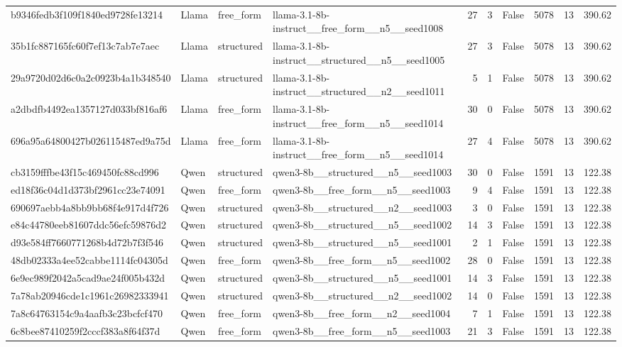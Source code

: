 \begin{longtable}{llllrrrrrr}
b9346fedb3f109f1840ed9728fe13214 & Llama & free\_form & llama-3.1-8b-instruct\_\_free\_form\_\_n5\_\_seed1008 & 27 & 3 & False & 5078 & 13 & 390.62 \\
35b1fc887165fc60f7ef13c7ab7e7aec & Llama & structured & llama-3.1-8b-instruct\_\_structured\_\_n5\_\_seed1005 & 27 & 3 & False & 5078 & 13 & 390.62 \\
29a9720d02d6c0a2c0923b4a1b348540 & Llama & structured & llama-3.1-8b-instruct\_\_structured\_\_n2\_\_seed1011 & 5 & 1 & False & 5078 & 13 & 390.62 \\
a2dbdfb4492ea1357127d033bf816af6 & Llama & free\_form & llama-3.1-8b-instruct\_\_free\_form\_\_n5\_\_seed1014 & 30 & 0 & False & 5078 & 13 & 390.62 \\
696a95a64800427b026115487ed9a75d & Llama & free\_form & llama-3.1-8b-instruct\_\_free\_form\_\_n5\_\_seed1014 & 27 & 4 & False & 5078 & 13 & 390.62 \\
cb3159fffbe43f15c469450fc88cd996 & Qwen & structured & qwen3-8b\_\_structured\_\_n5\_\_seed1003 & 30 & 0 & False & 1591 & 13 & 122.38 \\
ed18f36c04d1d373bf2961cc23e74091 & Qwen & free\_form & qwen3-8b\_\_free\_form\_\_n5\_\_seed1003 & 9 & 4 & False & 1591 & 13 & 122.38 \\
690697aebb4a8bb9bb68f4e917d4f726 & Qwen & structured & qwen3-8b\_\_structured\_\_n2\_\_seed1003 & 3 & 0 & False & 1591 & 13 & 122.38 \\
e84c44780eeb81607ddc56efc59876d2 & Qwen & structured & qwen3-8b\_\_structured\_\_n5\_\_seed1002 & 14 & 3 & False & 1591 & 13 & 122.38 \\
d93e584ff7660771268b4d72b7f3f546 & Qwen & structured & qwen3-8b\_\_structured\_\_n5\_\_seed1001 & 2 & 1 & False & 1591 & 13 & 122.38 \\
48db02333a4ee52cabbe1114fc04305d & Qwen & free\_form & qwen3-8b\_\_free\_form\_\_n5\_\_seed1002 & 28 & 0 & False & 1591 & 13 & 122.38 \\
6e9ec989f2042a5cad9ae24f005b432d & Qwen & structured & qwen3-8b\_\_structured\_\_n5\_\_seed1001 & 14 & 3 & False & 1591 & 13 & 122.38 \\
7a78ab20946cde1c1961c26982333941 & Qwen & structured & qwen3-8b\_\_structured\_\_n2\_\_seed1002 & 14 & 0 & False & 1591 & 13 & 122.38 \\
7a8c64763154c9a4aafb3c23bcfcf470 & Qwen & free\_form & qwen3-8b\_\_free\_form\_\_n2\_\_seed1004 & 7 & 1 & False & 1591 & 13 & 122.38 \\
6c8bee87410259f2cccf383a8f64f37d & Qwen & free\_form & qwen3-8b\_\_free\_form\_\_n5\_\_seed1003 & 21 & 3 & False & 1591 & 13 & 122.38 \\

\end{longtable}
